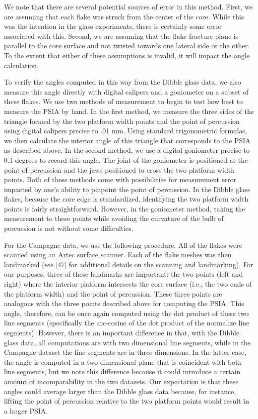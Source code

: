 \documentclass[10pt,letterpaper]{article}
\begin{document}
We note that there are several potential sources of error in this
method. First, we are assuming that each flake was struck from the
center of the core. While this was the intention in the glass
experiments, there is certainly some error associated with this. Second,
we are assuming that the flake fracture plane is parallel to the core
surface and not twisted towards one lateral side or the other. To the
extent that either of these assumptions is invalid, it will impact the
angle calculation.

To verify the angles computed in this way from the Dibble glass data, we
also measure this angle directly with digital calipers and a goniometer
on a subset of these flakes. We use two methods of measurement to begin
to test how best to measure the PSIA by hand. In the first method, we
measure the three sides of the triangle formed by the two platform width
points and the point of percussion using digital calipers precise to .01
mm. Using standard trigonometric formulas, we then calculate the
interior angle of this triangle that corresponds to the PSIA as
described above. In the second method, we use a digital goniometer
precise to 0.1 degrees to record this angle. The joint of the goniometer
is positioned at the point of percussion and the jaws positioned to
cross the two platform width points. Both of these methods come with
possibilities for measurement error impacted by one's ability to
pinpoint the point of percussion. In the Dibble glass flakes, because
the core edge is standardized, identifying the two platform width points
is fairly straightforward. However, in the goniometer method, taking the
measurement to these points while avoiding the curvature of the bulb of
percussion is not without some difficulties.

For the Campagne data, we use the following procedure. All of the flakes
were scanned using an Artec surface scanner. Each of the flake meshes
was then landmarked (see {[}47{]} for additional details on the scanning
and landmarking). For our purposes, three of these landmarks are
important: the two points (left and right) where the interior platform
intersects the core surface (i.e., the two ends of the platform width)
and the point of percussion. These three points are analogous with the
three points described above for computing the PSIA. This angle,
therefore, can be once again computed using the dot product of these two
line segments (specifically the arc-cosine of the dot product of the
normalize line segments). However, there is an important difference in
that, with the Dibble glass data, all computations are with two
dimensional line segments, while in the Campagne dataset the line
segments are in three dimensions. In the latter case, the angle is
computed in a two dimensional plane that is coincident with both line
segments, but we note this difference because it could introduce a
certain amount of incomparability in the two datasets. Our expectation
is that these angles could average larger than the Dibble glass data
because, for instance, lifting the point of percussion relative to the
two platform points would result in a larger PSIA.
\end{document}
